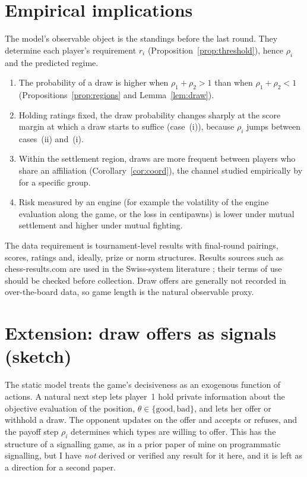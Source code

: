 \documentclass[11pt]{article}
\theoremstyle{definition}
\begin{document}
\section{Empirical implications}

The model's observable object is the standings before the last round. They
determine each player's requirement $r_i$ (Proposition~\ref{prop:threshold}),
hence $\rho_i$ and the predicted regime.

\begin{enumerate}
\item[\textbf{H1}] The probability of a draw is higher when
$\rho_1+\rho_2>1$ than when $\rho_1+\rho_2<1$ (Propositions~\ref{prop:regions}
and Lemma~\ref{lem:draw}).
\item[\textbf{H2}] Holding ratings fixed, the draw probability changes
sharply at the score margin at which a draw starts to suffice
(case~(i)), because $\rho_i$ jumps between cases~(ii) and~(i).
\item[\textbf{H3}] Within the settlement region, draws are more frequent
between players who share an affiliation (Corollary~\ref{cor:coord}), the
channel studied empirically by \citet{moulnye} for a specific group.
\item[\textbf{H4}] Risk measured by an engine (for example the volatility of
the engine evaluation along the game, or the loss in centipawns) is lower under
mutual settlement and higher under mutual fighting.
\end{enumerate}

The data requirement is tournament-level results with final-round pairings,
scores, ratings and, ideally, prize or norm structures. Results sources such
as chess-results.com are used in the Swiss-system literature
\citep{csato_sziklai}; their terms of use should be checked before collection.
Draw offers are generally not recorded in over-the-board data, so game length
is the natural observable proxy.

\section{Extension: draw offers as signals (sketch)}

The static model treats the game's decisiveness as an exogenous function of
actions. A natural next step lets player~1 hold private information about the
objective evaluation of the position, $\theta\in\{\text{good},\text{bad}\}$,
and lets her offer or withhold a draw. The opponent updates on the offer and
accepts or refuses, and the payoff step $\rho_i$ determines which types
are willing to offer. This has the structure of a signalling game, as in a
prior paper of mine on programmatic signalling, but I have \emph{not} derived
or verified any result for it here, and it is left as a direction for a
second paper.
\end{document}
